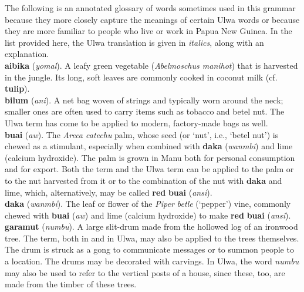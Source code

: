 The following is an annotated glossary of  words sometimes used in this grammar because they more closely capture the meanings of certain Ulwa words or because they are more familiar to people who live or work in Papua New Guinea. In the list provided here, the Ulwa translation is given in \textit{italics}, along with an  explanation.\\

\noindent \textbf{aibika} (\textit{yomal}). A leafy green vegetable (\textit{Abelmoschus manihot}) that is harvested in the jungle. Its long, soft leaves are commonly cooked in coconut milk (cf. \textbf{tulip}).\\

\noindent \textbf{bilum} (\textit{ani}). A net bag woven of strings and typically worn around the neck; smaller ones are often used to carry items such as tobacco and betel nut. The Ulwa term has come to be applied to modern, factory-made bags as well.\\

\noindent \textbf{buai} (\textit{aw}). The \textit{Areca catechu} palm, whose seed (or ‘nut’, i.e., ‘betel nut’) is chewed as a stimulant, especially when combined with \textbf{daka} (\textit{wanmbi}) and lime (calcium hydroxide). The palm is grown in Manu both for personal consumption and for export. Both the  term and the Ulwa term can be applied to the palm or to the nut harvested from it or to the combination of the nut with \textbf{daka} and lime, which, alternatively, may be called \textbf{red} \textbf{buai} (\textit{ansi}).\\

\noindent \textbf{daka} (\textit{wanmbi}). The leaf or flower of the \textit{Piper betle} (‘pepper’) vine, commonly chewed with \textbf{buai} (\textit{aw}) and lime (calcium hydroxide) to make \textbf{red} \textbf{buai} (\textit{ansi}).\\

\noindent \textbf{garamut} (\textit{numbu}). A large slit-drum made from the hollowed log of an ironwood tree. The term, both in  and in Ulwa, may also be applied to the trees themselves. The drum is struck as a gong to communicate messages or to summon people to a location. The drums may be decorated with carvings. In Ulwa, the word \textit{numbu} may also be used to refer to the vertical posts of a house, since these, too, are made from the timber of these trees.\\

